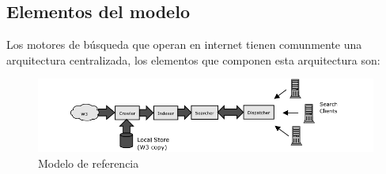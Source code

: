 \documentclass[a4paper, 11pt]{article} %
\begin{document}
	\subsection{Elementos del modelo}
	Los motores de búsqueda que operan en internet tienen comunmente una arquitectura centralizada, los elementos que componen esta arquitectura son:
	\begin{figure}[H]
	    \centering
    	\includegraphics[scale=0.75]{./img/modeloreferente.png}
	    \caption{Modelo de referencia}
	    \label{fig:my_label}
	\end{figure}
\end{document}
